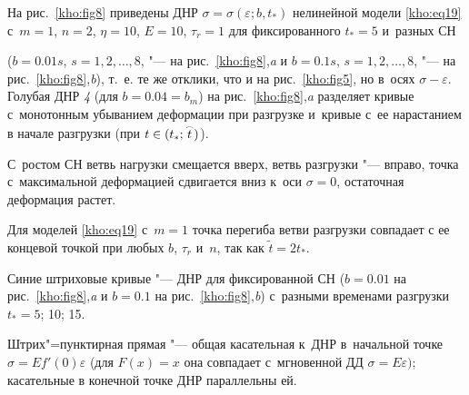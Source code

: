 На рис.~\ref{kho:fig8} приведены ДНР $\sigma=\sigma(\varepsilon;b,t_\ast)$ нелинейной модели \eqref{kho:eq19} с~$m=1$, $n=2$, $\eta=10$, $E=10$, $\tau_r=1$ для фиксированного $t_\ast=5$ и~разных СН 

($b=0.01s$, $s=1, 2, \dots, 8$, "--- на рис.~\ref{kho:fig8},{\sl a} и $b=0.1s$, $s=1, 2,\dots,8$, "--- на рис.~\ref{kho:fig8},{\sl b}), т.~е. те же отклики, что и на рис.~\ref{kho:fig5},  но в~осях $\sigma-\varepsilon$. Голубая ДНР {\sl 4} (для $b=0.04=b_m$) на рис.~\ref{kho:fig8},{\sl a} разделяет кривые с~монотонным убыванием деформации при разгрузке и~кривые с~ее нарастанием в начале разгрузки (при $t\in(t_\ast;\mathord{\buildrel{\lower3pt\hbox{$\scriptscriptstyle\frown$}}\over {t}})$). 

С~ростом СН ветвь нагрузки смещается вверх, ветвь разгрузки "--- вправо, точка с~максимальной деформацией сдвигается вниз к~оси $\sigma=0$, остаточная деформация растет. 

Для моделей \eqref{kho:eq19} с~$m=1$ точка перегиба ветви разгрузки совпадает с ее концевой точкой при любых $b$, $\tau_r$ и~$n$, так как $\tilde{t}=2t_\ast$. 

Синие штриховые кривые "--- ДНР для фиксированной СН ($b=0.01$ на рис.~\ref{kho:fig8},{\sl a} и $b=0.1$ на рис.~\ref{kho:fig8},{\sl b}) с~разными временами разгрузки $t_\ast=5$; 10; 15. 

Штрих"=пунктирная прямая "--- общая касательная к~ДНР в~начальной точке $\sigma=Ef'(0)\varepsilon$ (для $F(x)=x$ она совпадает с~мгновенной ДД $\sigma=E\varepsilon)$; касательные в конечной точке ДНР параллельны ей.



